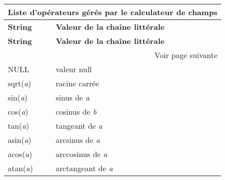 \begin{center}
{\setlength{\extrarowheight}{10pt}
\small
\begin{longtable}{|p{4cm}|p{10cm}|}
\hline \multicolumn{2}{|c|}{\textbf{Liste d'opérateurs gérés par le calculateur 
de champs}}\\
\hline \textbf{String}&\textbf{Valeur de la chaîne littérale}\\
\endfirsthead
\hline \textbf{String}&\textbf{Valeur de la chaîne littérale}\\
\endhead
\hline \multicolumn{2}{|r|}{{Voir page suivante}} \\ \hline
\endfoot
\endlastfoot
\hline NULL & valeur null \\
\hline sqrt(\textit{a}) & racine carrée \\
\hline sin(\textit{a}) & sinus de \textit{a} \\
\hline cos(\textit{a}) & cosinus de \textit{b} \\
\hline tan(\textit{a}) & tangeant de \textit{a} \\
\hline asin(\textit{a}) & arcsinus de \textit{a} \\
\hline acos(\textit{a}) & arccosinus de \textit{a} \\
\hline atan(\textit{a}) & arctangeant de \textit{a} \\

\end{longtable}}
\end{center}
